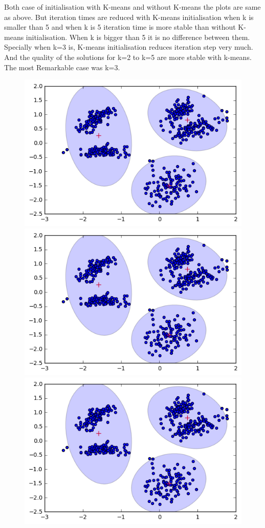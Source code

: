 \documentclass[a4paper,11pt]{article}
\begin{document}
Both case of initialisation with K-means and without K-means the plots are same as above. But iteration times are reduced with K-means initialisation when k is smaller than 5 and when k is 5 iteration time is more stable than without K-means initialisation. When k is bigger than 5 it is no difference between them. Specially when k=3 is, K-means initialisation reduces iteration step very much. And the quality of the solutions for k=2 to k=5 are more stable with k-means. The most Remarkable case was k=3.

\begin{figure}[htbp]
  \includegraphics[scale=0.2]{k3nk1.png}
  \includegraphics[scale=0.2]{k3nk2.png}
  \includegraphics[scale=0.2]{k3nk3.png}

\end{figure}
\end{document}
